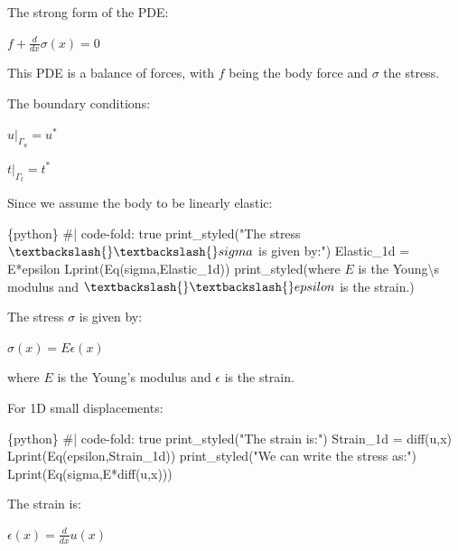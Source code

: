 \documentclass[
  11pt,
  a4paper,
]{scrbook}
\newenvironment{Shaded}{\begin{snugshade}}{\end{snugshade}}
\newcommand{\InformationTok}[1]{\textcolor[rgb]{0.37,0.37,0.37}{#1}}
\begin{document}
The strong form of the PDE:

$\displaystyle f + \frac{d}{d x} \sigma{\left(x \right)} = 0$

This PDE is a balance of forces, with \(f\) being the body force and
\(\sigma\) the stress.

The boundary conditions:

\(u|_{\Gamma_u} = u^*\)

\(t|_{\Gamma_t} = t^*\)

Since we assume the body to be linearly elastic:

\begin{Shaded}
\begin{Highlighting}[]
\InformationTok{\textasciigrave{}\textasciigrave{}\textasciigrave{}\{python\}}
\InformationTok{\#| code{-}fold: true}
\InformationTok{print\_styled("The stress $\textbackslash{}\textbackslash{}sigma$ is given by:")}
\InformationTok{Elastic\_1d = E*epsilon}
\InformationTok{Lprint(Eq(sigma,Elastic\_1d))}
\InformationTok{print\_styled(\textquotesingle{}where $E$ is the Young\textbackslash{}\textquotesingle{}s modulus and $\textbackslash{}\textbackslash{}epsilon$ is the strain.\textquotesingle{})}
\InformationTok{\textasciigrave{}\textasciigrave{}\textasciigrave{}}
\end{Highlighting}
\end{Shaded}

The stress \(\sigma\) is given by:

$\displaystyle \sigma{\left(x \right)} = E \epsilon{\left(x \right)}$

where \(E\) is the Young's modulus and \(\epsilon\) is the strain.

For 1D small displacements:

\begin{Shaded}
\begin{Highlighting}[]
\InformationTok{\textasciigrave{}\textasciigrave{}\textasciigrave{}\{python\}}
\InformationTok{\#| code{-}fold: true}
\InformationTok{print\_styled("The strain is:")}
\InformationTok{Strain\_1d = diff(u,x)}
\InformationTok{Lprint(Eq(epsilon,Strain\_1d))}
\InformationTok{print\_styled("We can write the stress as:")}
\InformationTok{Lprint(Eq(sigma,E*diff(u,x)))}
\InformationTok{\textasciigrave{}\textasciigrave{}\textasciigrave{}}
\end{Highlighting}
\end{Shaded}

The strain is:

$\displaystyle \epsilon{\left(x \right)} = \frac{d}{d x} u{\left(x \right)}$
\end{document}
